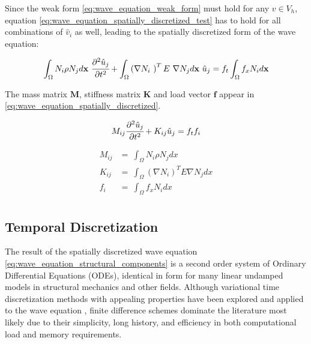Since the weak form \ref{eq:wave_equation_weak_form} must hold for any $v \in V_h$, equation \ref{eq:wave_equation_spatially_discretized_test} has to hold for all combinations of $\hat v_i$ as well, leading to the spatially discretized form of the wave equation:

\begin{equation} \label{eq:wave_equation_spatially_discretized}
	\int_{\Omega} N_i \rho N_j d \mathbf x \ \cfrac{\partial^2 \hat u_j}{\partial t^2}
	+
	\int_{\Omega} \left( \nabla N_i \ \right)^T E \ \nabla N_j d \mathbf x \ \hat u_j
	=
	f_t \int_{\Omega} f_x N_i d \mathbf x
\end{equation}

The mass matrix $\mathbf M$, stiffness matrix $\mathbf K$ and load vector $\mathbf f$ appear in \ref{eq:wave_equation_spatially_discretized}.

\begin{equation} \label{eq:wave_equation_structural_components}
M_{ij} \cfrac{\partial^2 \hat u_j}{\partial t^2}
+
K_{ij} \hat u_j
=
f_t f_i
\end{equation}

\begin{equation} \label{eq:structural_components}
	\begin{array}{rl}
		M_{ij} &= \ \int_{\Omega} N_i \rho N_j dx \\
		K_{ij} &= \ \int_{\Omega} \left( \nabla N_i \right)^T E \nabla N_j dx \\
		f_{i}  &= \ \int_{\Omega} f_x N_i dx \\
	\end{array}
\end{equation}

\subsection{Temporal Discretization}
\label{subsection:wave_equation_temporal_discretization}

The result of the spatially discretized wave equation \ref{eq:wave_equation_structural_components} is a second order system of Ordinary Differential Equations (ODEs), identical in form for many linear undamped models in structural mechanics and other fields. Although variational time discretization methods with appealing properties have been explored \cite{Zhao2014} and applied to the wave equation \cite{Kocher2014}, finite difference schemes dominate the literature most likely due to their simplicity, long history, and efficiency in both computational load and memory requirements.

